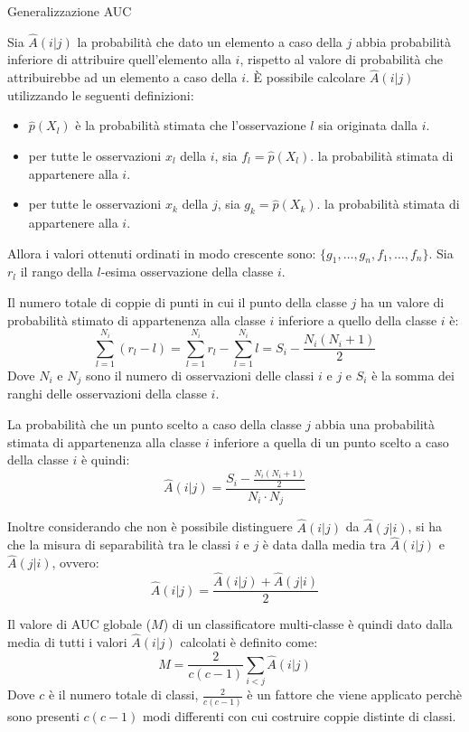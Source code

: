 \begin{definizione}{Generalizzazione AUC}{}

Sia $\hat{A}(i|j)$ la probabilità che dato un elemento a caso della  $j$
abbia probabilità inferiore di attribuire quell'elemento alla  $i$,
rispetto al valore di probabilità che attribuirebbe ad un elemento a caso
della  $i$.
È possibile calcolare $\hat{A}(i|j)$ utilizzando le seguenti definizioni:
\begin{itemize}
    \item $\hat{p}(X_l)$ è la probabilità stimata che l'osservazione $l$ sia
    originata dalla  $i$.
    \item per tutte le osservazioni $x_l$ della  $i$, sia $f_l = \hat{p}(X_l)$.
    la probabilità stimata di appartenere alla  $i$.
    \item per tutte le osservazioni $x_k$ della  $j$, sia $g_k = \hat{p}(X_k)$.
    la probabilità stimata di appartenere alla  $i$.
\end{itemize}

Allora i valori ottenuti ordinati in modo crescente sono:
$\{g_1, \ldots, g_n, f_1, \ldots, f_n\}$.
Sia $r_{l}$ il rango della $l$-esima osservazione della classe $i$.

Il numero totale di coppie di punti in cui il punto della classe $j$ ha
un valore di probabilità stimato di appartenenza alla classe $i$ inferiore
a quello della classe $i$ è:
\[
\sum_{l=1}^{N_i} (r_l - l) = \sum_{l=1}^{N_i} r_l - \sum_{l=1}^{N_i} l = S_i - \frac{N_i(N_i+1)}{2}
\]
Dove $N_i$ e $N_j$ sono il numero di osservazioni delle classi $i$ e $j$ e
$S_i$ è la somma dei ranghi delle osservazioni della classe $i$.

La probabilità che un punto scelto a caso della classe $j$ abbia una probabilità
stimata di appartenenza alla classe $i$ inferiore a quella di un punto
scelto a caso della classe $i$ è quindi:
\[
\hat{A}(i|j) = \frac{S_i - \frac{N_i(N_i+1)}{2}}{N_i \cdot N_j}
\]

Inoltre considerando che non è possibile distinguere $\hat{A}(i | j)$ da
$\hat{A}(j | i)$, si ha che la misura di separabilità tra le classi $i$ e $j$
è data dalla media tra $\hat{A}(i | j)$ e $\hat{A}(j | i)$, ovvero:
\[
\hat{A}(i|j) = \frac{\hat{A}(i|j) + \hat{A}(j|i)}{2}
\]

Il valore di AUC globale ($M$) di un classificatore multi-classe è quindi dato
dalla media di tutti i valori $\hat{A}(i|j)$ calcolati è definito come:
\[
M=\frac{2}{c(c-1)}\sum_{i<j}\hat{A}(i|j)
\]
Dove $c$ è il numero totale di classi, $\frac{2}{c(c-1)}$
è un fattore che viene applicato perchè sono presenti $c(c-1)$ modi
differenti con cui costruire coppie distinte di classi.

\end{definizione}

